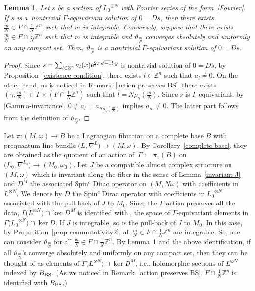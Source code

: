 \documentclass[10pt,a4paper]{amsart}
\numberwithin{equation}{section}
\newtheorem{Lemma}[Theorem]{Lemma}
\newcommand{\Z}{\mathbb{Z}}
\begin{document}
\begin{Lemma}\label{existence condition2}
Let $s$ be a section of ${L_0}^{\otimes N}$ with Fourier series of the form~\eqref{Fourier}. If $s$ is a~nontrivial $\Gamma$-equivariant solution of $0=Ds$, then there exists $\frac{m}{N}\in F\cap \frac{1}{N}\Z^n$ such that $m$ is integrable. Conversely, suppose that there exists ${\frac{m}{N}\in F\cap \frac{1}{N}\Z^n}$
such that $m$ is integrable
and $\vartheta_{\frac{m}{N}}$ converges absolutely and uniformly on any compact set. Then, $\vartheta_{\frac{m}{N}}$ is a nontrivial $\Gamma$-equivariant solution of $0=Ds$.
\end{Lemma}
\begin{proof}
Since $s=\sum_{l\in \Z^n}a_l(x){\rm e}^{2\pi\sqrt{-1}l\cdot y}$ is nontrivial solution of $0=Ds$, by Proposition~\ref{existence condition}, there exists $l\in \Z^n$ such that $a_l\not=0$. On the other hand, as is noticed in Remark~\ref{action preserves BS}, there exists $\left(\gamma ,\frac{m}{N}\right)\in \Gamma\times \left(F\cap \frac{1}{N}\Z^n\right)$ such that $l=N\rho_\gamma(\frac{m}{N})$. Since $s$ is $\Gamma$-equivariant, by \eqref{Gamma-invariance}, $0\not=a_l=a_{N\rho_\gamma(\frac{m}{N})}$ implies $a_m\not=0$.
%
The latter part follows from the definition of $\vartheta_{\frac{m}{N}}$.
\end{proof}

Let $\pi\colon (M,\omega)\to B$ be a Lagrangian fibration on a complete base $B$ with prequantum line bundle $\bigl(L,\nabla^L\bigr)\to (M,\omega)$. By Corollary~\ref{complete base}, they
are obtained as the quotient of an action of~${\Gamma:=\pi_1(B)}$ on $\bigl({L_0},\nabla^{L_0}\bigr)\to (M_0,\omega_0)$. Let $J$ be a compatible almost complex structure on~$(M,\omega)$ which is invariant along the fiber in the sense of Lemma~\ref{invariant J} and $D^M$ the associated Spin${}^c$ Dirac operator on $(M,N\omega)$ with coefficients in $L^{\otimes N}$. We denote by $D$ the Spin${}^c$ Dirac operator with coefficients in ${L_0}^{\otimes N}$ associated with the pull-back of $J$ to $M_0$. Since the $\Gamma$-action preserves all the data, $\Gamma \bigl(L^{\otimes N}\bigr)\cap \ker D^M$ is identified with , the space of $\Gamma$-equivariant elements in $\Gamma \bigl({L_0}^{\otimes N}\bigr)\cap \ker D$.
%
If $J$ is integrable, so is the pull-back of $J$ to $M_0$. In this case, by Proposition~\ref{prop commutativity2}, all $\frac{m}{N}\in F\cap \frac{1}{N}\Z^n$ are integrable. So, one can consider $\vartheta_{\frac{m}{N}}$ for all $\frac{m}{N}\in F\cap \frac{1}{N}\Z^n$. By Lemma~\ref{existence condition2} and the above identification, if all $\vartheta_{\frac{m}{N}}$'s converge absolutely and uniformly on any compact set, then they can be thought of as elements of $\Gamma \bigl(L^{\otimes N}\bigr)\cap \ker D^M$, i.e., holomorphic sections of $L^{\otimes N}$ indexed by $B_{\rm BS}$. (As we noticed in Remark~\ref{action preserves BS}, $F\cap \frac{1}{N}\Z^n$ is identified with $B_{\rm BS}$.)
\end{document}
